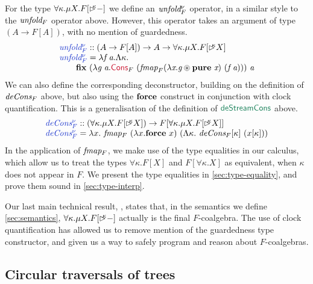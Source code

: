 For the type $\forall \kappa. \mu X. F[\mathord{\rhd\kern-0.4em^{\kappa}}-]$ we define an
$\textit{unfold$^\nu_F$}$ operator, in a similar style to the
$\textit{unfold$_F$}$ operator above. However, this operator takes an
argument of type $(A \to F[A])$, with no mention of guardedness.
\begin{displaymath}
  \begin{array}{l}
    \defn{unfold$^\nu_F$} :: (A \to F[A]) \to A \to \forall \kappa. \mu X. F[\delay\kappa X] \\
    \defn{unfold$^\nu_F$} = \lambda \ident{f}\ \ident{a}. \Lambda \kappa. \\
    \quad\quad\kw{fix}\ (\lambda \ident{g}\ \ident{a}. \cons{Cons}_F\ (\ident{fmap}_F (\lambda \ident{x}. \ident{g} \circledast \kw{pure}\ \ident{x})\ (\ident{f}\ \ident{a})))\ \ident{a}
  \end{array}
\end{displaymath}
We can also define the corresponding deconstructor, building on the
definition of $\textit{deCons$_F$}$ above, but also using the $\textbf{force}$
construct in conjunction with clock quantification. This is a
generalisation of the definition of $\elim{deStreamCons}$ above.
\begin{displaymath}
  \begin{array}{l}
    \defn{deCons$^\nu_F$} :: (\forall \kappa. \mu X. F[\delay\kappa X]) \to F[\forall \kappa. \mu X. F[\delay\kappa X]] \\
    \defn{deCons$^\nu_F$} = \lambda x.~\ident{fmap$_F$}\ (\lambda x. \kw{force}\ x)\ (\Lambda \kappa.~\ident{deCons$_F$}[\kappa]\ (x[\kappa]))
  \end{array}
\end{displaymath}
In the application of $\textit{fmap$_F$}$, we make use of the type
equalities in our calculus, which allow us to treat the types $\forall
\kappa. F[X]$ and $F[\forall \kappa. X]$ as equivalent, when $\kappa$
does not appear in $F$. We present the type equalities in
\autoref{sec:type-equality}, and prove them sound in
\autoref{sec:type-interp}.

Our last main technical result, , states
that, in the semantics we define \autoref{sec:semantics}, $\forall
\kappa. \mu X. F[\mathord{\rhd\kern-0.4em^{\kappa}}-]$ actually is the final
$F$-coalgebra. The use of clock quantification has allowed us to
remove mention of the guardedness type constructor, and given us a way
to safely program and reason about $F$-coalgebras.

\subsection{Circular traversals of trees}
\label{sec:repmin}

